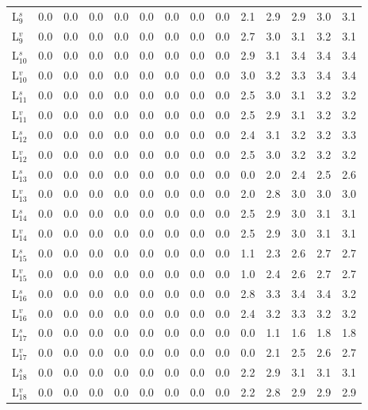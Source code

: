 \begin{table}[ht]
\begin{tabular}{l|lllllllllllll}
    L$^s_9$ & 0.0 & 0.0 & 0.0 & 0.0 & 0.0 & 0.0 & 0.0 & 0.0 & 2.1 & 2.9 & 2.9 & 3.0 & 3.1 \\
    L$^v_9$ & 0.0 & 0.0 & 0.0 & 0.0 & 0.0 & 0.0 & 0.0 & 0.0 & 2.7 & 3.0 & 3.1 & 3.2 & 3.1 \\
    L$^s_{10}$ & 0.0 & 0.0 & 0.0 & 0.0 & 0.0 & 0.0 & 0.0 & 0.0 & 2.9 & 3.1 & 3.4 & 3.4 & 3.4 \\
    L$^v_{10}$ & 0.0 & 0.0 & 0.0 & 0.0 & 0.0 & 0.0 & 0.0 & 0.0 & 3.0 & 3.2 & 3.3 & 3.4 & 3.4 \\
    L$^s_{11}$ & 0.0 & 0.0 & 0.0 & 0.0 & 0.0 & 0.0 & 0.0 & 0.0 & 2.5 & 3.0 & 3.1 & 3.2 & 3.2 \\
    L$^v_{11}$ & 0.0 & 0.0 & 0.0 & 0.0 & 0.0 & 0.0 & 0.0 & 0.0 & 2.5 & 2.9 & 3.1 & 3.2 & 3.2 \\
    L$^s_{12}$ & 0.0 & 0.0 & 0.0 & 0.0 & 0.0 & 0.0 & 0.0 & 0.0 & 2.4 & 3.1 & 3.2 & 3.2 & 3.3 \\
    L$^v_{12}$ & 0.0 & 0.0 & 0.0 & 0.0 & 0.0 & 0.0 & 0.0 & 0.0 & 2.5 & 3.0 & 3.2 & 3.2 & 3.2 \\
    L$^s_{13}$ & 0.0 & 0.0 & 0.0 & 0.0 & 0.0 & 0.0 & 0.0 & 0.0 & 0.0 & 2.0 & 2.4 & 2.5 & 2.6 \\
    L$^v_{13}$ & 0.0 & 0.0 & 0.0 & 0.0 & 0.0 & 0.0 & 0.0 & 0.0 & 2.0 & 2.8 & 3.0 & 3.0 & 3.0 \\
    L$^s_{14}$ & 0.0 & 0.0 & 0.0 & 0.0 & 0.0 & 0.0 & 0.0 & 0.0 & 2.5 & 2.9 & 3.0 & 3.1 & 3.1 \\
    L$^v_{14}$ & 0.0 & 0.0 & 0.0 & 0.0 & 0.0 & 0.0 & 0.0 & 0.0 & 2.5 & 2.9 & 3.0 & 3.1 & 3.1 \\
    L$^s_{15}$ & 0.0 & 0.0 & 0.0 & 0.0 & 0.0 & 0.0 & 0.0 & 0.0 & 1.1 & 2.3 & 2.6 & 2.7 & 2.7 \\
    L$^v_{15}$ & 0.0 & 0.0 & 0.0 & 0.0 & 0.0 & 0.0 & 0.0 & 0.0 & 1.0 & 2.4 & 2.6 & 2.7 & 2.7 \\
    L$^s_{16}$ & 0.0 & 0.0 & 0.0 & 0.0 & 0.0 & 0.0 & 0.0 & 0.0 & 2.8 & 3.3 & 3.4 & 3.4 & 3.2 \\
    L$^v_{16}$ & 0.0 & 0.0 & 0.0 & 0.0 & 0.0 & 0.0 & 0.0 & 0.0 & 2.4 & 3.2 & 3.3 & 3.2 & 3.2 \\
    L$^s_{17}$ & 0.0 & 0.0 & 0.0 & 0.0 & 0.0 & 0.0 & 0.0 & 0.0 & 0.0 & 1.1 & 1.6 & 1.8 & 1.8 \\
    L$^v_{17}$ & 0.0 & 0.0 & 0.0 & 0.0 & 0.0 & 0.0 & 0.0 & 0.0 & 0.0 & 2.1 & 2.5 & 2.6 & 2.7 \\
    L$^s_{18}$ & 0.0 & 0.0 & 0.0 & 0.0 & 0.0 & 0.0 & 0.0 & 0.0 & 2.2 & 2.9 & 3.1 & 3.1 & 3.1 \\
    L$^v_{18}$ & 0.0 & 0.0 & 0.0 & 0.0 & 0.0 & 0.0 & 0.0 & 0.0 & 2.2 & 2.8 & 2.9 & 2.9 & 2.9 \\

\end{tabular}
\end{table}
